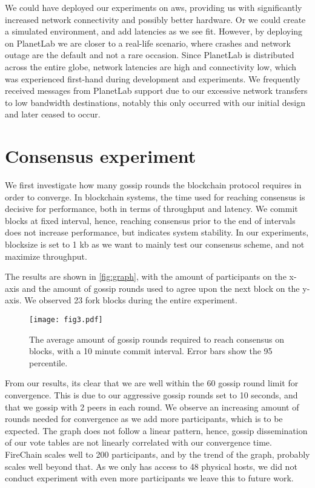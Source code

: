 \documentclass[USenglish]{uit-thesis}
\begin{document}
We could have deployed our experiments on \gls{aws}, providing us with significantly increased network connectivity and possibly better hardware.
Or we could create a simulated environment, and add latencies as we see fit.
However, by deploying on PlanetLab we are closer to a real-life scenario, where crashes and network outage are the default and not a rare occasion.
Since PlanetLab is distributed across the entire globe, network latencies are high and connectivity low, which was experienced first-hand during development and experiments.
We frequently received messages from PlanetLab support due to our excessive network transfers to low bandwidth destinations, notably this only occurred with our initial design and later ceased to occur. 



\section{Consensus experiment}
We first investigate how many gossip rounds the blockchain protocol requires in order to converge.
In blockchain systems, the time used for reaching consensus is decisive for performance, both in terms of throughput and latency.
We commit blocks at fixed interval, hence, reaching consensus prior to the end of intervals does not increase performance, but indicates system stability.
In our experiments, blocksize is set to 1 \gls{kb} as we want to mainly test our consensus scheme, and not maximize throughput.

The results are shown in \autoref{fig:graph}, with the amount of participants on the x-axis and the amount of gossip rounds used to agree upon the next block on the y-axis.  
We observed 23 fork blocks during the entire experiment.
\begin{figure}[h]
	\centering
	\texttt{[image: fig3.pdf]}
	\caption{The average amount of gossip rounds required to reach consensus on blocks, with a 10 minute commit interval. Error bars show the 95 percentile.}
	\label{fig:graph}
\end{figure}

From our results, its clear that we are well within the 60 gossip round limit for convergence.
This is due to our aggressive gossip rounds set to 10 seconds, and that we gossip with 2 peers in each round.
We observe an increasing amount of rounds needed for convergence as we add more participants, which is to be expected.
The graph does not follow a linear pattern, hence, gossip dissemination of our vote tables are not linearly correlated with our convergence time.
FireChain scales well to 200 participants, and by the trend of the graph, probably scales well beyond that.
As we only has access to 48 physical hosts, we did not conduct experiment with even more participants we leave this to future work. 
\end{document}
